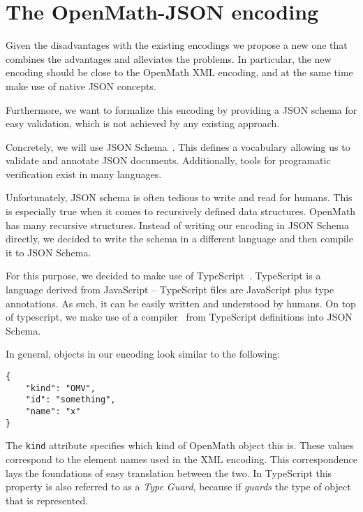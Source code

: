 \section{The OpenMath-JSON encoding}\label{sec:encoding}

Given the disadvantages with the existing encodings we propose a new one that combines the
advantages and alleviates the problems.  In particular, the new encoding should be close
to the OpenMath XML encoding, and at the same time make use of native JSON concepts.

Furthermore, we want to formalize this encoding by providing a JSON schema for easy
validation, which is not achieved by any existing approach.

Concretely, we will use JSON Schema~\cite{handrewsjsonschema:18}.  This defines a
vocabulary allowing us to validate and annotate JSON documents.  Additionally, tools for
programatic verification exist in many languages.

Unfortunately, JSON schema is often tedious to write and read for humans. 
This is especially true when it comes to recursively defined data structures.
OpenMath has many recursive structures.
Instead of writing our encoding in JSON Schema directly, we decided to write the schema in a different language and then compile it to JSON Schema. 

For this purpose, we decided to make use of TypeScript~\cite{typescript:webpage}. 
TypeScript is a language derived from JavaScript -- TypeScript files are JavaScript plus type annotations. 
As such, it can be easily written and understood by humans. 
On top of typescript, we make use of a compiler~\cite{vega-ts-jscon-schema-generator:webpage} from TypeScript definitions into JSON Schema. 

In general, objects in our encoding look similar to the following:
\\\begin{minipage}{\linewidth}
\begin{lstlisting}
{
    "kind": "OMV",
    "id": "something",
    "name": "x"
}
\end{lstlisting}\end{minipage}

The \texttt{kind} attribute specifies which kind of OpenMath object this is. 
These values correspond to the element names used in the XML encoding. 
This correspondence lays the foundations of easy translation between the two. 
In TypeScript this property is also referred to as a \textit{Type Guard}, because if \textit{guards} the type of object that is represented. 

